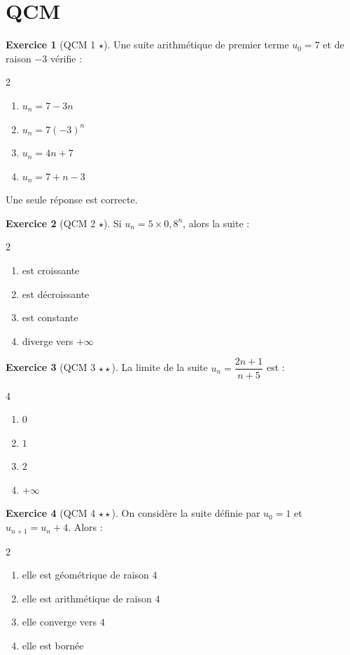 \documentclass[11pt,a4paper]{article}
\theoremstyle{definition}
\newtheorem{exercice}{Exercice}[section]
\newcommand{\etoile}[1]{\hfill{\small\textbf{#1}}}
\begin{document}
\section{QCM}

\begin{exercice}[QCM 1 \etoile{$\star$}]
Une suite arithmétique de premier terme $u_0=7$ et de raison $-3$ vérifie :
\begin{multicols}{2}
\begin{enumerate}[label=\Alph*.]
    \item $u_n=7-3n$
    \item $u_n=7(-3)^n$
    \item $u_n=4n+7$
    \item $u_n=7+n-3$
\end{enumerate}
\end{multicols}
Une seule réponse est correcte.
\end{exercice}

\begin{exercice}[QCM 2 \etoile{$\star$}]
Si $u_n=5\times 0{,}8^n$, alors la suite :
\begin{multicols}{2}
\begin{enumerate}[label=\Alph*.]
    \item est croissante
    \item est décroissante
    \item est constante
    \item diverge vers $+\infty$
\end{enumerate}
\end{multicols}
\end{exercice}

\begin{exercice}[QCM 3 \etoile{$\star\star$}]
La limite de la suite $u_n=\dfrac{2n+1}{n+5}$ est :
\begin{multicols}{4}
\begin{enumerate}[label=\Alph*.]
    \item $0$
    \item $1$
    \item $2$
    \item $+\infty$
\end{enumerate}
\end{multicols}
\end{exercice}

\begin{exercice}[QCM 4 \etoile{$\star\star$}]
On considère la suite définie par $u_0=1$ et $u_{n+1}=u_n+4$. Alors :
\begin{multicols}{2}
\begin{enumerate}[label=\Alph*.]
    \item elle est géométrique de raison $4$
    \item elle est arithmétique de raison $4$
    \item elle converge vers $4$
    \item elle est bornée
\end{enumerate}
\end{multicols}
\end{exercice}
\end{document}

